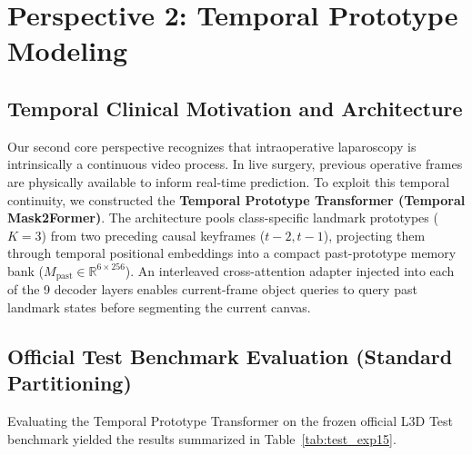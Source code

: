 \documentclass{article}
\begin{document}
\section{Perspective 2: Temporal Prototype Modeling}

\subsection{Temporal Clinical Motivation and Architecture}
Our second core perspective recognizes that intraoperative laparoscopy is intrinsically a continuous video process. In live surgery, previous operative frames are physically available to inform real-time prediction.
To exploit this temporal continuity, we constructed the \textbf{Temporal Prototype Transformer (Temporal Mask2Former)}.
The architecture pools class-specific landmark prototypes ($K=3$) from two preceding causal keyframes ($t-2, t-1$), projecting them through temporal positional embeddings into a compact past-prototype memory bank ($M_{\text{past}} \in \mathbb{R}^{6 \times 256}$). An interleaved cross-attention adapter injected into each of the 9 decoder layers enables current-frame object queries to query past landmark states before segmenting the current canvas.

\subsection{Official Test Benchmark Evaluation (Standard Partitioning)}
Evaluating the Temporal Prototype Transformer on the frozen official L3D Test benchmark yielded the results summarized in Table~\ref{tab:test_exp15}.

\begin{table}[H]
\centering
\caption{\textbf{Official L3D Test Benchmark Results for Temporal Prototype Transformer.} Evaluated across 109 official test frames under TopoNet-exact mutual exclusivity and metric formulations.}
\label{tab:test_exp15}
\small
{}
\end{table}
\end{document}
